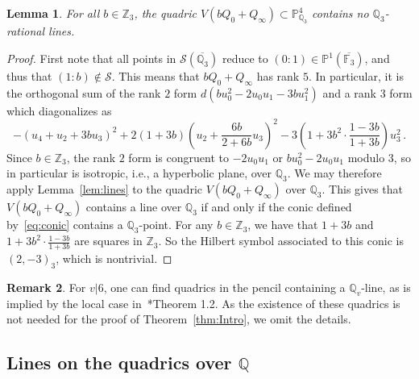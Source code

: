 \documentclass[12pt, reqno]{amsart}
\newcommand{\margBi}[1]{\normalsize{{\color{red}\footnote{{\color{magenta}#1}}}{\marginpar[{\color{red}\hfill\tiny\thefootnote$\rightarrow$}]{{\color{red}$\leftarrow$\tiny\thefootnote}}}}}
\newcommand{\Bianca}[1]{\margBi{(Bianca) #1}}
\newtheorem{lemma}{Lemma}
\theoremstyle{definition}
\newtheorem{rmk}[lemma]{Remark}
\newcommand{\PP}{{\mathbb P}}
\newcommand{\F}{{\mathbb F}}
\newcommand{\Q}{{\mathbb Q}}
\newcommand{\Z}{{\mathbb Z}}
\newcommand{\OO}{{\mathcal O}}
\newcommand{\scrS}{{\mathscr S}}
\begin{document}
   
   \begin{lemma}\label{lem:G3}
   	For all $b\in \Z_3$, the quadric \(V(bQ_0 + Q_{\infty}) \subset \PP^4_{\Q_3}\) contains no \(\Q_3\)-rational lines.%
   \end{lemma}
   \begin{proof}
   	First note that all points in $\scrS(\overline{\Q_3})$ reduce to \((0:1)\in \PP^1(\overline{\F_3})\), and thus that $(1:b) \not\in \scrS$. This means that $bQ_0+Q_\infty$ has rank $5$. In particular, it is the orthogonal sum of the 
rank \(2\) form \(d(bu_0^2 - 2u_0u_1 - 3bu_1^2)\) and a rank $3$ form which diagonalizes as
      \begin{equation}\label{eq:conic}
         -(u_4 + u_2 + 3bu_3)^2 + 2(1 + 3b)\left(u_2 + \frac{6b}{2 + 6b}u_3\right)^2 - 3\left(1 + 3b^2\cdot\frac{1 - 3b}{1 + 3b}\right)u_3^2\,.
      \end{equation}
      Since \(b\in \Z_3\), the rank \(2\) form is congruent to \(-2u_0u_1\) or \(bu_0^2 - 2u_0u_1\) modulo \(3\), so in particular is isotropic, i.e., a hyperbolic plane, over \(\Q_3\).
      We may therefore apply Lemma~\ref{lem:lines} to the quadric \(V(bQ_0 + Q_{\infty})\) over $\Q_3$. This gives that \(V(bQ_0 + Q_{\infty})\) contains a line over $\Q_3$ if and only if the conic defined by~\eqref{eq:conic} contains a $\Q_3$-point. For any \(b\in \Z_3\), we have that \(1 + 3b\) and \(1 + 3b^2\cdot\frac{1 - 3b}{1 + 3b}\) are squares in \(\Z_3\). So the Hilbert symbol associated to this conic is $(2,-3)_3$, which is nontrivial.
  \end{proof}
  

  \begin{rmk}
  	For $v|6$, one can find quadrics in the pencil containing a $\Q_v$-line, as is implied by the local case in~\cite{CV}*{Theorem 1.2}. As the existence of these quadrics is not needed for the proof of Theorem~\ref{thm:Intro}, we omit the details.
  \end{rmk}
 

\subsection{Lines on the quadrics over $\Q$}\label{sec:Adelic}
\end{document}
